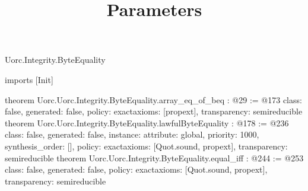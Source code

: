 \begin{lexlean}{Uorc.Integrity.ByteEquality}
\title{Parameters}
\begin{coremodule}
imports [Init]

theorem Uorc.Uorc.Integrity.ByteEquality.array_eq_of_beq : @29 := @173 {
  class: false,
  generated: false,
  policy: exact{axioms: [propext]},
  transparency: semireducible
}
theorem Uorc.Uorc.Integrity.ByteEquality.lawfulByteEquality : @178 := @236 {
  class: false,
  generated: false,
  instance: {attribute: global, priority: 1000, synthesis_order: []},
  policy: exact{axioms: [Quot.sound, propext]},
  transparency: semireducible
}
theorem Uorc.Uorc.Integrity.ByteEquality.equal_iff : @244 := @253 {
  class: false,
  generated: false,
  policy: exact{axioms: [Quot.sound, propext]},
  transparency: semireducible
}


\end{coremodule}
\end{lexlean}
